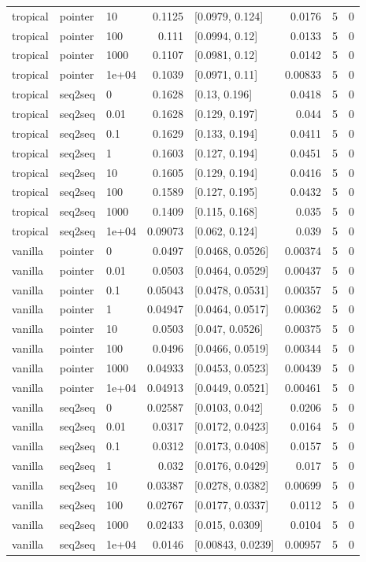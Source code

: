 \documentclass[10pt]{article}
\begin{document}
{\begin{longtable}{lllrlrrr}
tropical & pointer & 10 & 0.1125 & [0.0979, 0.124] & 0.0176 & 5 & 0\\
tropical & pointer & 100 & 0.111 & [0.0994, 0.12] & 0.0133 & 5 & 0\\
tropical & pointer & 1000 & 0.1107 & [0.0981, 0.12] & 0.0142 & 5 & 0\\
tropical & pointer & 1e+04 & 0.1039 & [0.0971, 0.11] & 0.00833 & 5 & 0\\
tropical & seq2seq & 0 & 0.1628 & [0.13, 0.196] & 0.0418 & 5 & 0\\
tropical & seq2seq & 0.01 & 0.1628 & [0.129, 0.197] & 0.044 & 5 & 0\\
tropical & seq2seq & 0.1 & 0.1629 & [0.133, 0.194] & 0.0411 & 5 & 0\\
tropical & seq2seq & 1 & 0.1603 & [0.127, 0.194] & 0.0451 & 5 & 0\\
tropical & seq2seq & 10 & 0.1605 & [0.129, 0.194] & 0.0416 & 5 & 0\\
tropical & seq2seq & 100 & 0.1589 & [0.127, 0.195] & 0.0432 & 5 & 0\\
tropical & seq2seq & 1000 & 0.1409 & [0.115, 0.168] & 0.035 & 5 & 0\\
tropical & seq2seq & 1e+04 & 0.09073 & [0.062, 0.124] & 0.039 & 5 & 0\\
vanilla & pointer & 0 & 0.0497 & [0.0468, 0.0526] & 0.00374 & 5 & 0\\
vanilla & pointer & 0.01 & 0.0503 & [0.0464, 0.0529] & 0.00437 & 5 & 0\\
vanilla & pointer & 0.1 & 0.05043 & [0.0478, 0.0531] & 0.00357 & 5 & 0\\
vanilla & pointer & 1 & 0.04947 & [0.0464, 0.0517] & 0.00362 & 5 & 0\\
vanilla & pointer & 10 & 0.0503 & [0.047, 0.0526] & 0.00375 & 5 & 0\\
vanilla & pointer & 100 & 0.0496 & [0.0466, 0.0519] & 0.00344 & 5 & 0\\
vanilla & pointer & 1000 & 0.04933 & [0.0453, 0.0523] & 0.00439 & 5 & 0\\
vanilla & pointer & 1e+04 & 0.04913 & [0.0449, 0.0521] & 0.00461 & 5 & 0\\
vanilla & seq2seq & 0 & 0.02587 & [0.0103, 0.042] & 0.0206 & 5 & 0\\
vanilla & seq2seq & 0.01 & 0.0317 & [0.0172, 0.0423] & 0.0164 & 5 & 0\\
vanilla & seq2seq & 0.1 & 0.0312 & [0.0173, 0.0408] & 0.0157 & 5 & 0\\
vanilla & seq2seq & 1 & 0.032 & [0.0176, 0.0429] & 0.017 & 5 & 0\\
vanilla & seq2seq & 10 & 0.03387 & [0.0278, 0.0382] & 0.00699 & 5 & 0\\
vanilla & seq2seq & 100 & 0.02767 & [0.0177, 0.0337] & 0.0112 & 5 & 0\\
vanilla & seq2seq & 1000 & 0.02433 & [0.015, 0.0309] & 0.0104 & 5 & 0\\
vanilla & seq2seq & 1e+04 & 0.0146 & [0.00843, 0.0239] & 0.00957 & 5 & 0\\
\bottomrule
\end{longtable}
}
\end{document}
